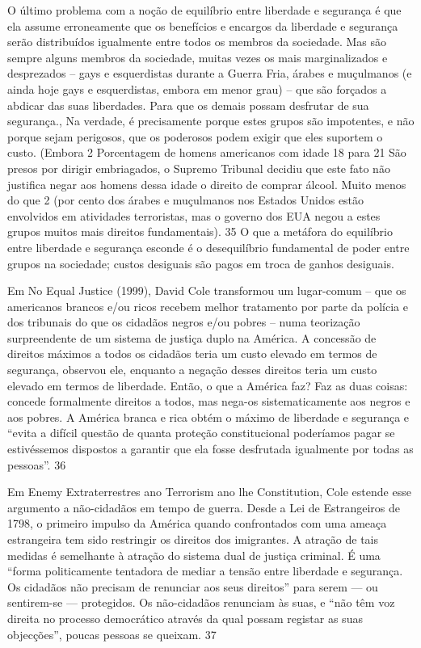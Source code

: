 O último problema com a noção de equilíbrio entre liberdade e segurança é que ela assume erroneamente que os benefícios e encargos da liberdade e segurança serão distribuídos igualmente entre todos os membros da sociedade. Mas são sempre alguns membros da sociedade, muitas vezes os mais marginalizados e desprezados – gays e esquerdistas durante a Guerra Fria, árabes e muçulmanos (e ainda hoje gays e esquerdistas, embora em menor grau) – que são forçados a abdicar das suas liberdades. Para que os demais possam desfrutar de sua segurança., Na verdade, é precisamente porque estes grupos são impotentes, e não porque sejam perigosos, que os poderosos podem exigir que eles suportem o custo. (Embora
 {\color{blue} 2}  
Porcentagem de homens americanos com idade
 {\color{blue} 18}  
para
 {\color{blue} 21}  
São presos por dirigir embriagados, o Supremo Tribunal decidiu que este fato não justifica negar aos homens dessa idade o direito de comprar álcool. Muito menos do que
 {\color{blue} 2}  
(por cento dos árabes e muçulmanos nos Estados Unidos estão envolvidos em atividades terroristas, mas o governo dos EUA negou a estes grupos muitos mais direitos fundamentais).
 {\color{blue} 35}  
O que a metáfora do equilíbrio entre liberdade e segurança esconde é o desequilíbrio fundamental de poder entre grupos na sociedade; custos desiguais são pagos em troca de ganhos desiguais.
 
\par
 
Em No Equal Justice (1999), David Cole transformou um lugar-comum – que os americanos brancos e/ou ricos recebem melhor tratamento por parte da polícia e dos tribunais do que os cidadãos negros e/ou pobres – numa teorização surpreendente de um sistema de justiça duplo na América. A concessão de direitos máximos a todos os cidadãos teria um custo elevado em termos de segurança, observou ele, enquanto a negação desses direitos teria um custo elevado em termos de liberdade. Então, o que a América faz? Faz as duas coisas: concede formalmente direitos a todos, mas nega-os sistematicamente aos negros e aos pobres. A América branca e rica obtém o máximo de liberdade e segurança e “evita a difícil questão de quanta proteção constitucional poderíamos pagar se estivéssemos dispostos a garantir que ela fosse desfrutada igualmente por todas as pessoas”.
 {\color{blue} 36}  

 
\par
 
Em Enemy Extraterrestres ano Terrorism ano lhe Constitution, Cole estende esse argumento a não-cidadãos em tempo de guerra. Desde a Lei de Estrangeiros de 1798, o primeiro impulso da América quando confrontados com uma ameaça estrangeira tem sido restringir os direitos dos imigrantes. A atração de tais medidas é semelhante à atração do sistema dual de justiça criminal. É uma “forma politicamente tentadora de mediar a tensão entre liberdade e segurança. Os cidadãos não precisam de renunciar aos seus direitos” para serem — ou sentirem-se — protegidos. Os não-cidadãos renunciam às suas, e “não têm voz direita no processo democrático através da qual possam registar as suas objecções”, poucas pessoas se queixam.
 {\color{blue} 37}  

